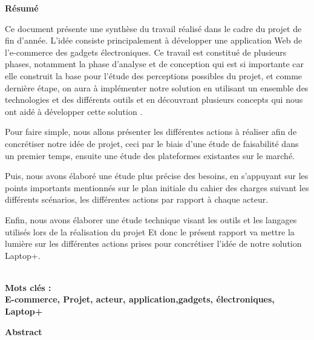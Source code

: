\documentclass[a4paper,12pt]{report}
\begin{document}
\clearpage
{}
\begin{doublespace}
\begin{center}
\vspace*{1cm}

\textbf{\huge{Résumé}}

\end{center}
\end{doublespace}
\begin{doublespace}

Ce document présente une synthèse du travail réalisé  dans le cadre du projet de fin d'année. L'idée consiste principalement à développer  une application Web de l'e-commerce des gadgets électroniques. Ce travail est constitué de plusieurs phases, notamment la phase d’analyse et de conception qui est si importante car elle  construit la base pour l'étude 
des perceptions possibles du projet, et comme dernière étape, on aura à implémenter notre solution en 
utilisant un ensemble des technologies et des différents outils et en découvrant plusieurs concepts  qui nous ont aidé à développer cette solution .

Pour faire simple, nous allons présenter les différentes actions à réaliser afin de concrétiser notre idée de projet, ceci par le biais d’une étude de faisabilité dans un premier temps, ensuite une étude des plateformes existantes sur le marché.

Puis, nous avons élaboré une étude plus précise des besoins, en s’appuyant sur les points importants mentionnés sur le plan initiale du cahier des charges suivant les différents scénarios, les différentes actions par rapport à chaque acteur.

Enfin, nous avons élaborer une étude technique visant les outils et les langages utilisés lors de la réalisation du projet
Et donc le présent rapport va mettre la lumière sur les différentes actions prises pour concrétiser l’idée de notre solution Laptop+. 


\textbf	{\\Mots clés :\\ E-commerce, Projet, acteur, application,gadgets, électroniques, Laptop+ }






\end{doublespace}
\clearpage
{}
\begin{doublespace}
\begin{center}
\vspace*{1cm}

\textbf{\huge{Abstract}}
\end{center}
\end{doublespace}
\end{document}
